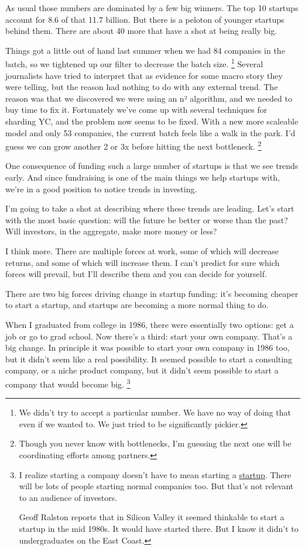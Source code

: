 \documentclass[12pt]{book}
\begin{document}
As usual those numbers are dominated by a few big winners. The top 10
startups account for 8.6 of that 11.7 billion. But there is a peloton of
younger startups behind them. There are about 40 more that have a shot
at being really big.

Things got a little out of hand last summer when we had 84 companies in
the batch, so we tightened up our filter to decrease the batch size.
\footnote{We didn't try to accept a particular number. We have no way of
doing that even if we wanted to. We just tried to be significantly
pickier.} Several journalists have tried to interpret that
as evidence for some macro story they were telling, but the reason had
nothing to do with any external trend. The reason was that we discovered
we were using an n² algorithm, and we needed to buy time to fix it.
Fortunately we've come up with several techniques for sharding YC, and
the problem now seems to be fixed. With a new more scaleable model and
only 53 companies, the current batch feels like a walk in the park. I'd
guess we can grow another 2 or 3x before hitting the next bottleneck.
\footnote{Though you never know with bottlenecks, I'm guessing the next
one will be coordinating efforts among partners.}

One consequence of funding such a large number of startups is that we
see trends early. And since fundraising is one of the main things we
help startups with, we're in a good position to notice trends in
investing.

I'm going to take a shot at describing where these trends are leading.
Let's start with the most basic question: will the future be better or
worse than the past? Will investors, in the aggregate, make more money
or less?

I think more. There are multiple forces at work, some of which will
decrease returns, and some of which will increase them. I can't predict
for sure which forces will prevail, but I'll describe them and you can
decide for yourself.

There are two big forces driving change in startup funding: it's
becoming cheaper to start a startup, and startups are becoming a more
normal thing to do.

When I graduated from college in 1986, there were essentially two
options: get a job or go to grad school. Now there's a third: start your
own company. That's a big change. In principle it was possible to start
your own company in 1986 too, but it didn't seem like a real
possibility. It seemed possible to start a consulting company, or a
niche product company, but it didn't seem possible to start a company
that would become big. \footnote{I realize starting a company doesn't have to mean starting a
\href{growth.html}{startup}. There will be lots of people starting
normal companies too. But that's not relevant to an audience of
investors.

Geoff Ralston reports that in Silicon Valley it seemed thinkable to
start a startup in the mid 1980s. It would have started there. But I
know it didn't to undergraduates on the East Coast.}
\end{document}
